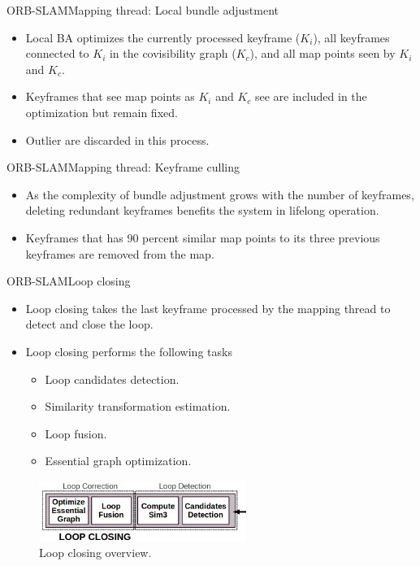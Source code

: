 \documentclass[aspectratio=169]{beamer}
\begin{document}
\begin{frame}{ORB-SLAM}{Mapping thread: Local bundle adjustment}
  \begin{itemize}
      \item{
      Local BA optimizes the currently processed keyframe ($K_{i}$), all keyframes connected to $K_{i}$ in the covisibility graph ($K_{c}$), and all map points seen by $K_{i}$ and $K_{c}$.
      }
      \item{
      Keyframes that see map points as $K_{i}$ and $K_{c}$ see are included in the optimization but remain fixed.
      }
      \item{
      Outlier are discarded in this process.
      }
  \end{itemize}
\end{frame}

\begin{frame}{ORB-SLAM}{Mapping thread: Keyframe culling}
  \begin{itemize}
      \item{
      As the complexity of bundle adjustment grows with the number of keyframes, deleting redundant keyframes benefits the system in lifelong operation.
      }
      \item{
      Keyframes that has 90 percent similar map points to its three previous keyframes are removed from the map.
      }
  \end{itemize}
\end{frame}

\begin{frame}{ORB-SLAM}{Loop closing}
  \begin{itemize}
      \item{
      Loop closing takes the last keyframe processed by the mapping thread to detect and close the loop.
      }
      \item{
      Loop closing performs the following tasks
      \begin{itemize}
          \item{
          Loop candidates detection.
          }
          \item{
          Similarity transformation estimation.
          }
          \item{
          Loop fusion.
          }
          \item{
          Essential graph optimization.
          }
      \end{itemize}
      }
  \end{itemize}
  \begin{figure}
\includegraphics[scale=0.7]{figs/LoopClosing}
\caption{Loop closing overview.}
\end{figure}
\end{frame}
\end{document}
